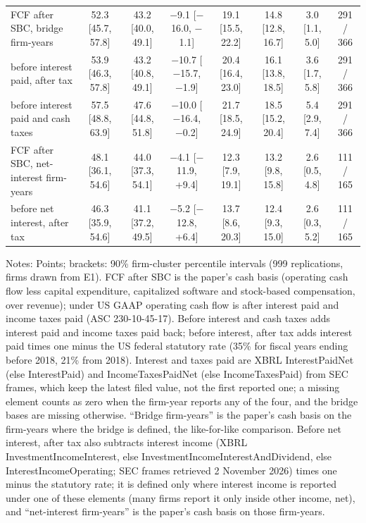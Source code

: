 \begin{table}[t]
{\begin{tabular}{lccccccc}
FCF after SBC, bridge firm-years & 52.3 [45.7, 57.8] & 43.2 [40.0, 49.1] & $-$9.1 [$-$16.0, $-$1.1] & 19.1 [15.5, 22.2] & 14.8 [12.8, 16.7] & 3.0 [1.1, 5.0] & 291 / 366 \\
before interest paid, after tax & 53.9 [46.3, 57.8] & 43.2 [40.8, 49.1] & $-$10.7 [$-$15.7, $-$1.9] & 20.4 [16.4, 23.0] & 16.1 [13.8, 18.5] & 3.6 [1.7, 5.8] & 291 / 366 \\
before interest paid and cash taxes & 57.5 [48.8, 63.9] & 47.6 [44.8, 51.8] & $-$10.0 [$-$16.4, $-$0.2] & 21.7 [18.5, 24.9] & 18.5 [15.2, 20.4] & 5.4 [2.9, 7.4] & 291 / 366 \\
FCF after SBC, net-interest firm-years & 48.1 [36.1, 54.6] & 44.0 [37.3, 54.1] & $-$4.1 [$-$11.9, +9.4] & 12.3 [7.9, 19.1] & 13.2 [9.8, 15.8] & 2.6 [0.5, 4.8] & 111 / 165 \\
before net interest, after tax & 46.3 [35.9, 54.6] & 41.1 [37.2, 49.5] & $-$5.2 [$-$12.8, +6.4] & 13.7 [8.6, 20.3] & 12.4 [9.3, 15.0] & 2.6 [0.3, 5.2] & 111 / 165 \\
\bottomrule\end{tabular}}
\par\vspace{2pt}\footnotesize\raggedright Notes: Points; brackets: 90\% firm-cluster percentile intervals (999 replications, firms drawn from E1). FCF after SBC is the paper's cash basis (operating cash flow less capital expenditure, capitalized software and stock-based compensation, over revenue); under US GAAP operating cash flow is after interest paid and income taxes paid (ASC 230-10-45-17). Before interest and cash taxes adds interest paid and income taxes paid back; before interest, after tax adds interest paid times one minus the US federal statutory rate (35\% for fiscal years ending before 2018, 21\% from 2018). Interest and taxes paid are XBRL InterestPaidNet (else InterestPaid) and IncomeTaxesPaidNet (else IncomeTaxesPaid) from SEC frames, which keep the latest filed value, not the first reported one; a missing element counts as zero when the firm-year reports any of the four, and the bridge bases are missing otherwise. ``Bridge firm-years'' is the paper's cash basis on the firm-years where the bridge is defined, the like-for-like comparison. Before net interest, after tax also subtracts interest income (XBRL InvestmentIncomeInterest, else InvestmentIncomeInterestAndDividend, else InterestIncomeOperating; SEC frames retrieved 2 November 2026) times one minus the statutory rate; it is defined only where interest income is reported under one of these elements (many firms report it only inside other income, net), and ``net-interest firm-years'' is the paper's cash basis on those firm-years.
\end{table}